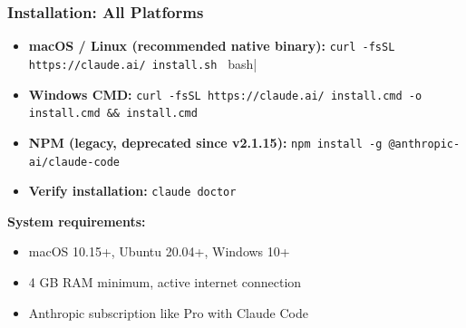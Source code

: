 \begin{frame}[fragile]\frametitle{Installation: All Platforms}
  \begin{itemize}
    \item \textbf{macOS / Linux (recommended native binary):}
    \lstinline|curl -fsSL https://claude.ai/ install.sh | bash|
    \item \textbf{Windows CMD:}
    \lstinline|curl -fsSL https://claude.ai/ install.cmd -o install.cmd && install.cmd|
    \item \textbf{NPM (legacy, deprecated since v2.1.15):}
    \lstinline|npm install -g @anthropic-ai/claude-code|
    \item \textbf{Verify installation:}
    \lstinline|claude doctor|
  \end{itemize}

\textbf{System requirements:}
  \begin{itemize}
    \item macOS 10.15+, Ubuntu 20.04+, Windows 10+ %
    \item 4 GB RAM minimum, active internet connection
	\item Anthropic subscription like Pro with Claude Code 
  \end{itemize}
\end{frame}


